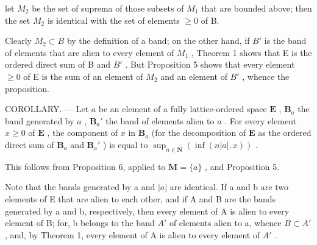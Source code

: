 let \(M_{2}\) be the set of suprema of those subsets of \(M_{1}\) that are bounded above; then the set \(M_{2}\) is identical with the set of elements \(\geqslant0\) of B.

Clearly \(M_{2} \subset B\) by the definition of a band; on the other hand, if \(B'\) is the band of elements that are alien to every element of \(M_{1}\) , Theorem 1 shows that E is the ordered direct sum of B and \(B'\) . But Proposition 5 shows that every element \(\geqslant 0\) of E is the sum of an element of \(M_{2}\) and an element of \(B'\) , whence the proposition.

COROLLARY. --- Let \(a\) be an element of a fully lattice-ordered space \(\mathbf{E}\) , \(\mathbf{B}_a\) the band generated by \(a\) , \(\mathbf{B}_a'\) the band of elements alien to \(a\) . For every element \(x \geqslant 0\) of \(\mathbf{E}\) , the component of \(x\) in \(\mathbf{B}_a\) (for the decomposition of \(\mathbf{E}\) as the ordered direct sum of \(\mathbf{B}_a\) and \(\mathbf{B}_a'\) ) is equal to \(\sup_{n \in \mathbf{N}} \left( \inf(n|a|, x) \right)\) .

This follows from Proposition 6, applied to \(\mathbf{M} = \{a\}\) , and Proposition 5.

Note that the bands generated by a and \(|a|\) are identical. If a and b are two elements of E that are alien to each other, and if A and B are the bands generated by a and b, respectively, then every element of A is alien to every element of B; for, b belongs to the band \(A'\) of elements alien to a, whence \(B \subset A'\) , and, by Theorem 1, every element of A is alien to every element of \(A'\) .

